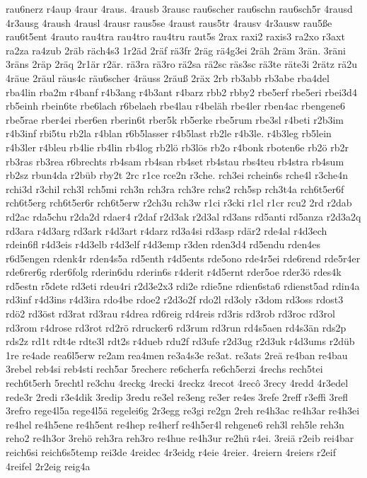 {rau6nerz
r4aup
4raur
4raus.
4rausb
3rausc
rau6scher
rau6schn
rau6sch5r
4rausd
4r3ausg
4raush
4rausl
4rausr
raus5se
4raust
raus5tr
4rausv
4r3ausw
rau5ße
rau6t5ent
4rauto
rau4tra
rau4tro
rau4tru
raut5s
2rax
raxi2
raxis3
ra2xo
r3axt
ra2za
ra4zub
2räb
räch4s3
1r2äd
2räf
rä3fr
2räg
rä4g3ei
2räh
2räm
3rän.
3räni
3räns
2räp
2räq
2r1är
r2är.
rä3ra
rä3ro
rä2sa
rä2sc
räs3sc
rä3te
räte3i
2rätz
rä2u
4räue
2räul
räus4c
räu6scher
4räuss
2räuß
2räx
2rb
rb3abb
rb3abe
rba4del
rba4lin
rba2m
r4banf
r4b3ang
r4b3ant
r4barz
rbb2
rbby2
rbe5erf
rbe5eri
rbei3d4
rb5einh
rbein6te
rbe6lach
r6belaeh
rbe4lau
r4beläh
rbe4ler
rben4ac
rbengene6
rbe5rae
rber4ei
rber6en
rberin6t
rber5k
rb5erke
rbe5rum
rbe3sl
r4beti
r2b3im
r4b3inf
rbi5tu
rb2la
r4blan
r6b5lasser
r4b5last
rb2le
r4b3le.
r4b3leg
rb5lein
r4b3ler
r4bleu
rb4lie
rb4lin
rb4log
rb2lö
rb3lös
rb2o
r4bonk
rboten6e
rb2ö
rb2r
rb3ras
rb3rea
r6brechts
rb4sam
rb4san
rb4set
rb4stau
rbs4teu
rb4stra
rb4sum
rb2sz
rbun4da
r2büb
rby2t
2rc
r1ce
rce2n
r3che.
rch3ei
rchein6s
rche4l
r3che4n
rchi3d
r3chil
rch3l
rch5mi
rch3n
rch3ra
rch3re
rchs2
rch5sp
rch3t4a
rch6t5er6f
rch6t5erg
rch6t5er6r
rch6t5erw
r2ch3u
rch3w
r1ci
r3cki
r1cl
r1cr
rcu2
2rd
r2dab
rd2ac
rda5chu
r2da2d
rdaer4
r2daf
r2d3ak
r2d3al
rd3ans
rd5anti
rd5anza
r2d3a2q
rd3ara
r4d3arg
rd3ark
r4d3art
r4darz
rd3a4si
rd3asp
rdär2
rde4al
r4d3ech
rdein6fl
r4d3eis
r4d3elb
r4d3elf
r4d3emp
r3den
rden3d4
rd5endu
rden4es
r6d5engen
rdenk4r
rden4s5a
rd5enth
r4d5ents
rde5ono
rde4r5ei
rde6rend
rde5r4er
rde6rer6g
rder6folg
rderin6du
rderin6s
r4derit
r4d5ernt
rder5oe
rder3ö
rdes4k
rd5estn
r5dete
rd3eti
rdeu4ri
r2d3e2x3
rdi2e
rdie5ne
rdien6sta6
rdienst5ad
rdin4a
rd3inf
r4d3ins
r4d3ira
rdo4be
rdoe2
r2d3o2f
rdo2l
rd3oly
r3dom
rd3oss
rdost3
rdö2
rd3öst
rd3rat
rd3rau
r4drea
rd6reig
rd4reis
rd3ris
rd3rob
rd3roc
rd3rol
rd3rom
r4drose
rd3rot
rd2rö
rdrucker6
rd3rum
rd3run
rd4s5aen
rd4s3än
rds2p
rds2z
rd1t
rdt4e
rdte3l
rdt2s
r4dueb
rdu2f
rd3ufe
r2d3ug
r2d3uk
r4d3ums
r2düb
1re
re4ade
rea6l5erw
re2am
rea4men
re3a4s3e
re3at.
re3ats
2reä
re4ban
re4bau
3rebel
reb4si
reb4sti
rech5ar
5recherc
re6cherfa
re6ch5erzi
4rechs
rech5tei
rech6t5erh
5rechtl
re3chu
4reckg
4recki
4reckz
4recot
4recô
3recy
4redd
4r3edel
rede3r
2redi
r3e4dik
3redip
3redu
re3el
re3eng
re3er
re4es
3refe
2reff
r3effi
3refl
3refro
rege4l5a
rege4l5ä
regelei6g
2r3egg
re3gi
re2gn
2reh
re4h3ac
re4h3ar
re4h3ei
re4hel
re4h5ene
re4h5ent
re4hep
re4herf
re4h5er4l
rehgene6
reh3l
reh5le
reh3n
reho2
re4h3or
3rehö
reh3ra
reh3ro
re4hue
re4h3ur
re2hü
r4ei.
3reiä
r2eib
rei4bar
reich6si
reich6s5temp
rei3de
4reidec
4r3eidg
r4eie
4reier.
4reiern
4reiers
r2eif
4reifel
2r2eig
reig4a
}
